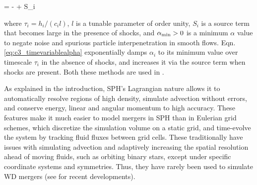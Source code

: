 \eqbegin
{} = - + S_i
\label{eq:c3_timevariablealpha}
\eqend

\noindent where $\tau_i = h_i/(c_i l)$, $l$ is a tunable parameter of order unity, $S_i$ is a source term that becomes large in the presence of shocks, and $\alpha_\mathrm{min} > 0$ is a minimum $\alpha$ value to negate noise and spurious particle interpenetration in smooth flows.  Eqn. \ref{eq:c3_timevariablealpha} exponentially damps $\alpha_i$ to its minimum value over timescale $\tau_i$ in the absence of shocks, and increases it via the source term when shocks are present.  Both these methods are used in \gasoline.


As explained in the introduction, SPH's Lagrangian nature allows it to automatically resolve regions of high density, simulate advection without errors, and conserve energy, linear and angular momentum to high accuracy.  These features make it much easier to model mergers in SPH than in Eulerian grid schemes, which discretize the simulation volume on a static grid, and time-evolve the system by tracking fluid fluxes between grid cells.  These traditionally have issues with simulating advection and adaptively increasing the spatial resolution ahead of moving fluids, such as orbiting binary stars, except under specific coordinate systems and symmetries.  Thus, they have rarely been used to simulate WD mergers (see \cite{katz+16} for recent developments).

